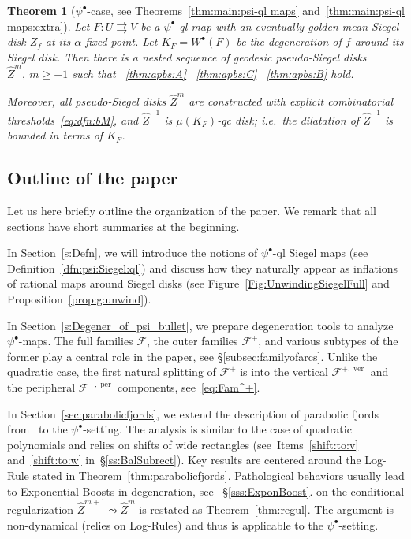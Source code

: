 \documentclass{amsart}
\newcommand{\1}{{\mathbb 1 }}
\newcommand{\Fam}{{\mathcal F}}
\newcommand{\wZ}{{\widehat Z}}
\newcommand\ver{{\operatorname{ver}}}
\newcommand\per{{\operatorname{per}}}
\newtheorem{thm}{Theorem}[section]
\theoremstyle{remark}
\numberwithin{equation}{section}
\theoremstyle{definition}
\begin{document}
\begin{thm}[$\psi^\bullet$-case, see Theorems~\ref{thm:main:psi-ql maps} and~\ref{thm:main:psi-ql maps:extra}]\label{thm:main:psi*-ql maps}
Let $F\colon U\rightrightarrows V$ be a $\psi^\bullet$-ql map with an eventually-golden-mean Siegel disk $Z_f$ at its $\alpha$-fixed point.
Let $K_F = W^\bullet(F)$ be the degeneration of $f$ around its Siegel disk.
Then there is a nested sequence of geodesic pseudo-Siegel disks $\wZ^m,\  m\ge -1$ such that ~\ref{thm:apbs:A} ~\ref{thm:apbs:C} ~\ref{thm:apbs:B} hold.


Moreover, all pseudo-Siegel disks $\wZ^m$ are constructed with explicit combinatorial thresholds~\eqref{eq:dfn:bM}, and $\wZ^{-1}$ is $\mu(K_F)$-qc disk; i.e.~the dilatation of $\wZ^{-1}$ is bounded in terms of $K_F$.
\end{thm}


\subsection{Outline of the paper} Let us here briefly outline the organization of the paper. We remark that all sections have short summaries at the beginning.

 

In Section~\ref{s:Defn}, we will introduce the notions of $\psi^\bullet$-ql Siegel maps (see Definition~\ref{dfn:psi:Siegel:ql}) and discuss how they naturally appear as inflations of rational maps around Siegel disks (see Figure~\ref{Fig:UnwindingSiegelFull} and Proposition~\ref{prop:g:unwind}). 


In Section~\ref{s:Degener_of_psi_bullet}, we prepare degeneration tools to analyze $\psi^\bullet$-maps. The full families $\Fam$, the outer families $\Fam^+$, and various subtypes of the former play a central role in the paper, see \S\ref{subsec:familyofarcs}. Unlike the quadratic case, the first natural splitting of $\Fam^{+}$ is into the vertical $\Fam^{+,\ver}$ and the peripheral $\Fam^{+,\per}$ components, see~\eqref{eq:Fam^+}. 


In Section~\ref{sec:parabolicfjords}, we extend the description of parabolic fjords from~\cite[\S4]{DL22} to the $\psi^\bullet$-setting. The analysis is similar to the case of quadratic polynomials and relies on shifts of wide rectangles (see~Items~\ref{shift:to:v} and~\ref{shift:to:w} in~\S\ref{ss:BalSubrect}). Key results are centered around the Log-Rule stated in Theorem~\ref{thm:parabolicfjords}. Pathological behaviors usually lead to Exponential Boosts in degeneration, see
~\S\ref{sss:ExponBoost}.
\cite[Corollary 7.3]{DL22} on the conditional regularization $\wZ^{m+1}\leadsto \wZ^m$ is restated as Theorem~\ref{thm:regul}. The argument is non-dynamical (relies on Log-Rules) and thus is applicable to the $\psi^\bullet$-setting.
\end{document}
